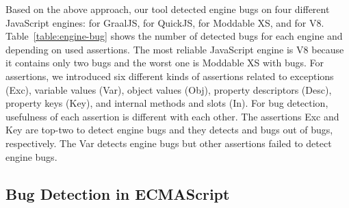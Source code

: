 Based on the above approach, our tool detected  engine bugs on four
different JavaScript engines: \inred{-} for GraalJS, \inred{-} for QuickJS,
\inred{-} for Moddable XS, and \inred{-} for V8.  Table~\ref{table:engine-bug}
shows the number of detected bugs for each engine and depending on used
assertions.  The most reliable JavaScript engine is V8 because it contains only
two bugs and the worst one is Moddable XS with \inred{-} bugs.  For assertions,
we introduced six different kinds of assertions related to exceptions
(\textsf{Exc}), variable values (\textsf{Var}), object values (\textsf{Obj}),
property descriptors (\textsf{Desc}), property keys (\textsf{Key}), and
internal methods and slots (\textsf{In}).  For bug detection, usefulness of each
assertion is different with each other.  The assertions \textsf{Exc} and
\textsf{Key} are top-two to detect engine bugs and they detects \inred{-} and
\inred{-} bugs out of  bugs, respectively.  The \textsf{Var} detects
\inred{-} engine bugs but other assertions failed to detect engine bugs.



\subsection{Bug Detection in ECMAScript}

